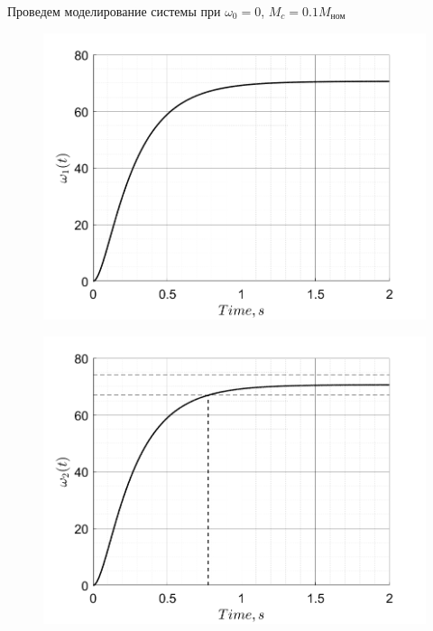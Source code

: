 Проведем моделирование системы при $\omega_0 = 0$, $M_c = 0.1M_\text{ном}$
\begin{figure}[!h]
    \centering
    \begin{minipage}{0.5\textwidth}
        \centering
        \includegraphics[width = \textwidth]{img/task21_omega1}
        \label{fig:img/task21_omega1}
    \end{minipage}%
    \begin{minipage}{0.5\textwidth}
        \centering
        \includegraphics[width = \textwidth]{img/task21_omega2}
        \label{fig:img/task21_omega2}
    \end{minipage}
    \begin{minipage}{0.5\textwidth}
        \centering

\end{minipage}
\end{figure}

